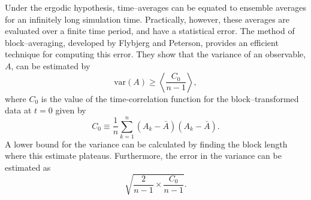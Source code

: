 Under the ergodic hypothesis, time--averages can be equated to ensemble averages for an infinitely long simulation time.\cite{Bopp2008}
Practically, however, these averages are evaluated over a finite time period, and have a statistical error.
The method of block--averaging, developed by Flybjerg and Peterson, provides an efficient technique for computing this error.\cite{Flyvbjerg1989}
They show that the variance of an observable, $A$, can be estimated by
\begin{equation}
\mathrm{var}(A) \geq \left< \frac{C_{0}}{n-1} \right>,
\end{equation}
where $C_{0}$ is the value of the time-correlation function for the block--transformed data at $t=0$ given by
\begin{equation}
C_{0} \equiv \frac{1}{n} \sum_{k=1}^{n} \left( A_{k} - \bar{A} \right) \left(A_{k} - \bar{A} \right).
\end{equation}
A lower bound for the variance can be calculated by finding the block length where this estimate plateaus.
Furthermore, the error in the variance can be estimated as 
\begin{equation}
\sqrt{\frac{2}{n-1} \times \frac{C_{0}}{n-1}}.
\end{equation}

